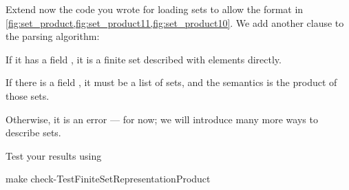\begin{codeexercise}
Extend now the code you wrote for loading sets to allow the format in \cref{fig:set_product,fig:set_product11,fig:set_product10}.
We add another clause to the parsing algorithm:
\begin{compactenum}
  \item If it has a field , it is a finite set described with elements directly.
  \item If there is a field , it must be a list of sets, and the semantics is the product of those sets.
  \item Otherwise, it is an error --- for now; we will introduce many more ways to describe sets.
\end{compactenum}
Test your results using
  \begin{console}
    make check-TestFiniteSetRepresentationProduct
  \end{console}
\end{codeexercise}